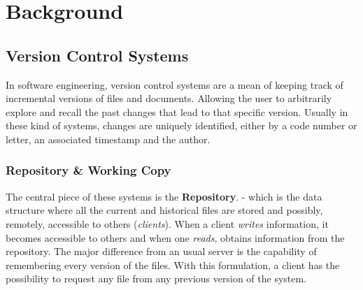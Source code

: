 \theoremstyle{definition}
\newtheorem{definition}{Definition}[section]
\chapter{Background}
\label{chapter:background}

\section{Version Control Systems}

In software engineering, version control systems are a mean of keeping track of incremental versions of files and documents. Allowing the user to arbitrarily explore and recall the past changes that lead to that specific version. Usually in these kind of systems, changes are uniquely identified, either by a code number or letter, an associated timestamp and the author.\cite{santolucito2018statically} 


\subsection{Repository \& Working Copy}

The central piece of these systems is the \textbf{Repository}. - which is the data structure where all the current and historical files are stored and possibly, remotely, accessible to others (\textit{clients}).\cite{santolucito2018statically} When a client \textit{writes} information, it becomes accessible to others and when one \textit{reads}, obtains information from the repository. The major difference from an usual server is the capability of remembering every version of the files. With this formulation, a client has the possibility to request any file from any previous version of the system.

